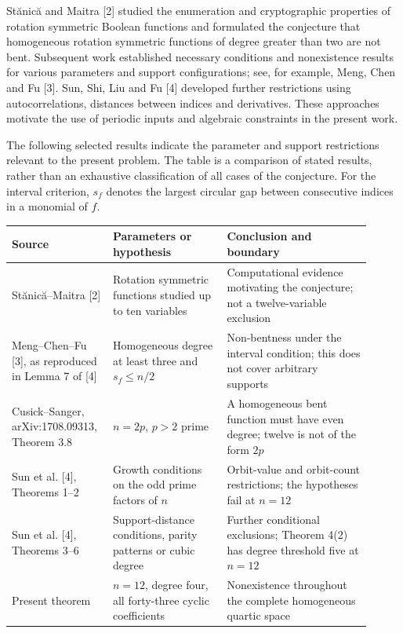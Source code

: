 \documentclass[11pt,a4paper]{article}
\begin{document}
St\u{a}nic\u{a} and Maitra [2] studied the enumeration and cryptographic properties of rotation symmetric Boolean functions and formulated the conjecture that homogeneous rotation symmetric functions of degree greater than two are not bent. Subsequent work established necessary conditions and nonexistence results for various parameters and support configurations; see, for example, Meng, Chen and Fu [3]. Sun, Shi, Liu and Fu [4] developed further restrictions using autocorrelations, distances between indices and derivatives. These approaches motivate the use of periodic inputs and algebraic constraints in the present work.

The following selected results indicate the parameter and support restrictions relevant to the present problem. The table is a comparison of stated results, rather than an exhaustive classification of all cases of the conjecture. For the interval criterion, $s_f$ denotes the largest circular gap between consecutive indices in a monomial of $f$.

{\footnotesize
\setlength{\tabcolsep}{3pt}

\begin{longtable}{@{}>{\raggedright\arraybackslash}p{0.23\linewidth}>{\raggedright\arraybackslash}p{0.3\linewidth}>{\raggedright\arraybackslash}p{0.38\linewidth}@{}}
\toprule
Source & Parameters or hypothesis & Conclusion and boundary \\
\midrule\endhead
St\u{a}nic\u{a}--Maitra [2] & Rotation symmetric functions studied up to ten variables & Computational evidence motivating the conjecture; not a twelve-variable exclusion \\
Meng--Chen--Fu [3], as reproduced in Lemma 7 of [4] & Homogeneous degree at least three and $s_f\le n/2$ & Non-bentness under the interval condition; this does not cover arbitrary supports \\
Cusick--Sanger, arXiv:1708.09313, Theorem 3.8 & $n=2p$, $p>2$ prime & A homogeneous bent function must have even degree; twelve is not of the form $2p$ \\
Sun et al. [4], Theorems 1--2 & Growth conditions on the odd prime factors of $n$ & Orbit-value and orbit-count restrictions; the hypotheses fail at $n=12$ \\
Sun et al. [4], Theorems 3--6 & Support-distance conditions, parity patterns or cubic degree & Further conditional exclusions; Theorem 4(2) has degree threshold five at $n=12$ \\
Present theorem & $n=12$, degree four, all forty-three cyclic coefficients & Nonexistence throughout the complete homogeneous quartic space \\
\bottomrule
\end{longtable}

}
\end{document}
